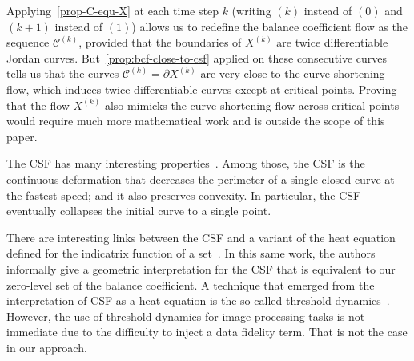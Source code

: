 \documentclass[review]{siamart220329}
\newcommand{\C}{\mathcal{C}} %
\begin{document}
Applying~\cref{prop-C-equ-X} at each time step $k$ (writing
$(k)$ instead of $(0)$ and $(k+1)$ instead of $(1)$) allows us to
redefine the balance coefficient flow as the sequence $\C^{(k)}$,
provided that the boundaries of $X^{(k)}$ are twice differentiable
Jordan curves. But~\cref{prop:bcf-close-to-csf} applied on
these consecutive curves tells us that the curves $\C^{(k)}=\partial
X^{(k)}$ are very close to the curve shortening flow, which induces
twice differentiable curves except at critical points. Proving that
the flow $X^{(k)}$ also mimicks the curve-shortening flow across
critical points would require much more mathematical work and is
outside the scope of this paper.

The CSF has many interesting
properties~\cite{huisken84flow,gage86heat,ecker2008heat}. Among those, the CSF
is the continuous deformation that decreases the perimeter of a single closed
curve at the fastest speed; and it also preserves convexity. In particular, the
CSF eventually collapses the initial curve to a single point.

There are interesting links between the CSF and a variant of the heat equation
defined for the indicatrix function of a set~\cite{merriman1992diffusion}. In
this same work, the authors informally give a geometric interpretation for the
CSF that is equivalent to our zero-level set of the balance coefficient. A
technique that emerged from the interpretation of CSF as a heat equation is the
so called threshold dynamics~\cite{esedoglu2005threshold,esedoglu2008threshold}.
However, the use of threshold dynamics for image processing tasks is not
immediate due to the difficulty to inject a data fidelity term. That is not the
case in our approach.
\end{document}

